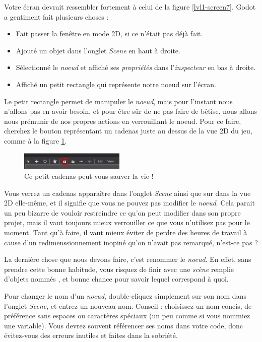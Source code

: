 Votre écran devrait ressembler fortement à celui de la figure \ref{lvl1-screen7}. Godot a gentiment fait plusieurs choses :

\begin{itemize}
\item Fait passer la fenêtre en mode 2D, si ce n'était pas déjà fait.
\item Ajouté un objet  dans l'onglet \emph{Scene} en haut à droite.
\item Sélectionné le \emph{noeud} et affiché ses \emph{propriétés} dans l'\emph{inspecteur} en bas à droite.
\item Affiché un petit rectangle qui représente notre noeud sur l'écran.
\end{itemize}

Le petit rectangle permet de manipuler le \emph{noeud}, mais pour l'instant nous n'allons pas en avoir besoin, et pour être sûr de ne pas faire de bêtise, nous allons nous prémunir de nos propres actions en verrouillant le noeud. Pour ce faire, cherchez le bouton représentant un cadenas juste au dessus de la vue 2D du jeu, comme à la figure \ref{lvl1-lock}.

\begin{figure}
  \begin{center}
    \includegraphics[width=5cm]{img/lvl1-lock.png}
  \end{center}
  \caption{\label{lvl1-lock} Ce petit cadenas peut vous sauver la vie !}
\end{figure}

Vous verrez un cadenas apparaître dans l'onglet \emph{Scene} ainsi que sur dans la vue 2D elle-même, et il signifie que vous ne pouvez pas modifier le \emph{noeud}. Cela parait un peu bizarre de vouloir restreindre ce qu'on peut modifier dans son propre projet, mais il vaut toujours mieux verrouiller ce que vous n'utilisez pas pour le moment. Tant qu'à faire, il vaut mieux éviter de perdre des heures de travail à cause d'un redimenssionnement inopiné qu'on n'avait pas remarqué, n'est-ce pas ?

La dernière chose que nous devons faire, c'est renommer le \emph{noeud}. En effet, sans prendre cette bonne habitude, vous risquez de finir avec une \emph{scène} remplie d'objets nommés , et bonne chance pour savoir lequel correspond à quoi.

Pour changer le nom d'un \emph{noeud}, double-cliquez simplement sur son nom dans l'onglet \emph{Scene}, et entrez un nouveau nom. Conseil : choisissez un nom concis, de préférence sans espaces ou caractères spéciaux (un peu comme si vous nommiez une variable). Vous devrez souvent référencer ses noms dans votre code, donc évitez-vous des erreurs inutiles et faites dans la sobriété.

